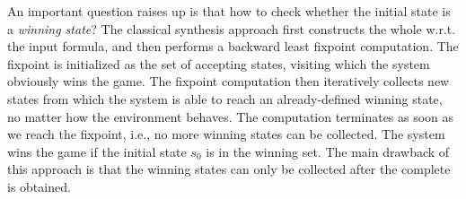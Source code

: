 An important question raises up is that how to check whether the initial state is a \emph{winning state}? The classical synthesis approach \cite{GV15} first constructs the whole \dfa w.r.t. the input \ltlf formula, and then performs a backward least fixpoint computation. The fixpoint is initialized as the set of accepting states, visiting which the system obviously wins the game. The fixpoint computation then iteratively collects new states from which the system is able to reach an already-defined winning state, no matter how the environment behaves. The computation terminates as soon as we reach the fixpoint, i.e., no more winning states can be collected. The system wins the game if the initial state $s_0$ is in the winning set. The main drawback of this approach is that the winning states can only be collected after the complete \dfa is obtained.  


